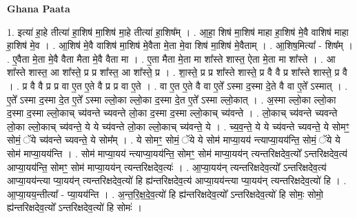 \documentclass[17pt]{extarticle}
\begin{document}
\textbf{Ghana Paata } \newline

1. इत्या॑ हा॒हे तीत्या॑ हा॒शिष॑ मा॒शिष॑ मा॒हे तीत्या॑ हा॒शिष᳚म् । . आ॒हा॒ शिष॑ मा॒शिष॑ माहा हा॒शिष॑ मे॒वै वाशिष॑ माहा हा॒शिष॑ मे॒व । . आ॒शिष॑ मे॒वै वाशिष॑ मा॒शिष॑ मे॒वैता मे॒ता मे॒वा शिष॑ मा॒शिष॑ मे॒वैताम् । . आ॒शिष॒मित्या᳚ - शिष᳚म् । . ए॒वैता मे॒ता मे॒वै वैता मैता मे॒वै वैता मा । . ए॒ता मैता मे॒ता मा शा᳚स्ते शास्त॒ ऐता मे॒ता मा शा᳚स्ते । . आ शा᳚स्ते शास्त॒ आ शा᳚स्ते॒ प्र प्र शा᳚स्त॒ आ शा᳚स्ते॒ प्र । . शा॒स्ते॒ प्र प्र शा᳚स्ते शास्ते॒ प्र वै वै प्र शा᳚स्ते शास्ते॒ प्र वै । . प्र वै वै प्र प्र वा ए॒त ए॒ते वै प्र प्र वा ए॒ते । . वा ए॒त ए॒ते वै वा ए॒ते᳚ ऽस्मा द॒स्मा दे॒ते वै वा ए॒ते᳚ ऽस्मात् । . ए॒ते᳚ ऽस्मा द॒स्मा दे॒त ए॒ते᳚ ऽस्मा ल्लो॒का ल्लो॒का द॒स्मा दे॒त ए॒ते᳚ ऽस्मा ल्लो॒कात् । . अ॒स्मा ल्लो॒का ल्लो॒का द॒स्मा द॒स्मा ल्लो॒काच् च्य॑वन्ते च्यवन्ते लो॒का द॒स्मा द॒स्मा ल्लो॒काच् च्य॑वन्ते । . लो॒काच् च्य॑वन्ते च्यवन्ते लो॒का ल्लो॒काच् च्य॑वन्ते॒ ये ये च्य॑वन्ते लो॒का ल्लो॒काच् च्य॑वन्ते॒ ये । . च्य॒व॒न्ते॒ ये ये च्य॑वन्ते च्यवन्ते॒ ये सोमꣳ॒॒ सोमं॒ ॅये च्य॑वन्ते च्यवन्ते॒ ये सोम᳚म् । . ये सोमꣳ॒॒ सोमं॒ ॅये ये सोम॑ माप्या॒यय॑ न्त्याप्या॒यय॑न्ति॒ सोमं॒ ॅये ये सोम॑ माप्या॒यय॑न्ति । . सोम॑ माप्या॒यय॑ न्त्याप्या॒यय॑न्ति॒ सोमꣳ॒॒ सोम॑ माप्या॒यय॑न् त्यन्तरिक्षदेव॒त्यो᳚ ऽन्तरिक्षदेव॒त्य॑ आप्या॒यय॑न्ति॒ सोमꣳ॒॒ सोम॑ माप्या॒यय॑न् त्यन्तरिक्षदेव॒त्यः॑ । . आ॒प्या॒यय॑न् त्यन्तरिक्षदेव॒त्यो᳚ ऽन्तरिक्षदेव॒त्य॑ आप्या॒यय॑न्त्या प्या॒यय॑न् त्यन्तरिक्षदेव॒त्यो॑ हि ह्य॑न्तरिक्षदेव॒त्य॑ आप्या॒यय॑न्त्या प्या॒यय॑न् त्यन्तरिक्षदेव॒त्यो॑ हि । . आ॒प्या॒यय॒न्तीत्या᳚ - प्या॒यय॑न्ति । . अ॒न्त॒रि॒क्ष॒दे॒व॒त्यो॑ हि ह्य॑न्तरिक्षदेव॒त्यो᳚ ऽन्तरिक्षदेव॒त्यो॑ हि सोमः॒ सोमो॒ ह्य॑न्तरिक्षदेव॒त्यो᳚ ऽन्तरिक्षदेव॒त्यो॑ हि सोमः॑ । \newline
\end{document}

